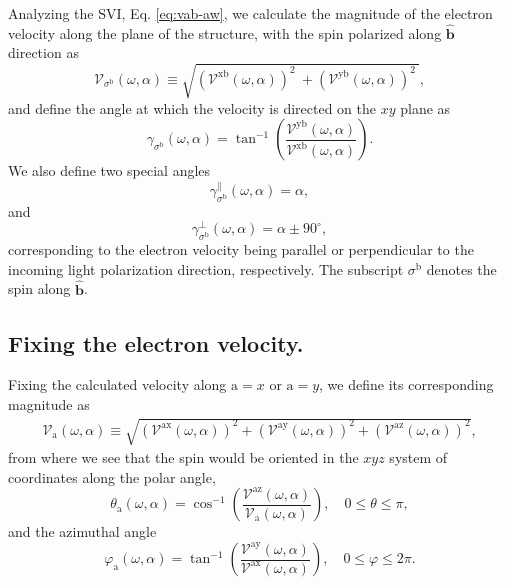 \documentclass[floatfix,prb,aps,superscriptaddress,showpacs,11pt,preprint,letterpaper]{revtex4}
\begin{document}
Analyzing the SVI, Eq. \eqref{eq:vab-aw}, we calculate the magnitude
of the electron velocity along the plane of the structure, with the spin
polarized along $\hat{\mathbf{b}}$ direction as
\begin{equation}
\mathcal{V}_{\sigma^{\mathrm{b}}}(\omega,\alpha)
\equiv
\sqrt{
\left(\mathcal{V}^{\mathrm{xb}}(\omega,\alpha)\right)^{2}\ +
\left(\mathcal{V}^{\mathrm{yb}}(\omega,\alpha)\right)^{2}\ 
}, 
\label{eq:vs-mag}
\end{equation}
and define the angle at which the velocity is directed on the $xy$ plane as
\begin{equation}
\gamma_{\sigma^\mathrm{b}} (\omega,\alpha)
=
\tan^{-1} \left( \frac{\mathcal{V}^{\mathrm{yb}}(\omega,\alpha)}
{\mathcal{V}^{\mathrm{xb}}(\omega,\alpha)} \right)
.
\label{eq:gamma-ang}
\end{equation}
We also define two special angles
\begin{equation}
\gamma_{\sigma^\mathrm{b}}^\parallel(\omega,\alpha) = \alpha, 
\label{eq:gamma-par} 
\end{equation}
and
\begin{equation}
\gamma_{\sigma^\mathrm{b}}^\perp(\omega,\alpha) = \alpha \pm 90^{\circ},
\label{eq:gamma-perp}
\end{equation}
corresponding to the electron velocity being parallel or perpendicular to the
incoming light polarization direction, respectively. 
The subscript $\sigma^\mathrm{b}$
denotes the spin along $\hat{\mathbf{b}}$.

\subsection{Fixing the electron velocity.}\label{sec:theory-fixvel}

Fixing the calculated velocity along $\mathrm{a}=x$ or $\mathrm{a}=y$, we
define its corresponding magnitude as
\begin{align}
\mathcal{V}_{\mathrm{a}}(\omega,\alpha) \equiv 
\sqrt { 
\left(\mathcal{V}^{\mathrm{ax}}(\omega,\alpha)\right)^{2} +
\left(\mathcal{V}^{\mathrm{ay}}(\omega,\alpha)\right)^{2} +
\left(\mathcal{V}^{\mathrm{az}}(\omega,\alpha)\right)^{2} 
},
\label{eq:vv-mag}
\end{align}
from where we see that the spin would be oriented in the $xyz$ system of
coordinates along the polar angle, 
\begin{equation}
\theta_{\mathrm{a}}  (\omega,\alpha) = 
\cos^{-1} \left( \frac{\mathcal{V}^{\mathrm{az}}(\omega,\alpha)}
{\mathcal{V}_{\mathrm{a}}(\omega,\alpha)} \right),
 \quad 0 \leq \theta \leq \pi, 
\label{eq:polar-ang}
\end{equation}
and the azimuthal angle
\begin{equation}
\varphi_{\mathrm{a}} (\omega,\alpha) =
\tan^{-1} \left( \frac{\mathcal{V}^{\mathrm{ay}}(\omega,\alpha)}
{\mathcal{V}^{\mathrm{ax}}(\omega,\alpha)} \right),
\quad 0 \leq \varphi \leq 2\pi.
\label{eq:azimuthal-ang} 
\end{equation} 
\end{document}
